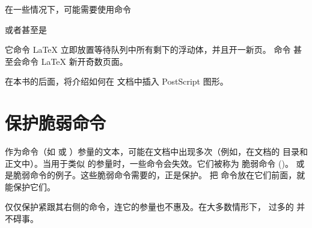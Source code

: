 在一些情况下，可能需要使用命令

\begin{lscommand}
 或者甚至是 
\end{lscommand}

\noindent
它命令 \LaTeX{} 立即放置等待队列中所有剩下的浮动体，并且开一新页。
命令  甚至会命令 \LaTeX{} 新开奇数页面。

在本书的后面，将介绍如何在 \LaTeXe{} 文档中插入 PostScript 图形。

\section{保护脆弱命令}

作为命令（如  或 ）参量的文本，可能在文档中出现多次（例如，在文档的
目录和正文中）。当用于类似  的参量时，一些命令会失效。它们被称为
脆弱命令 ()。 或  是脆弱命令的例子。这些脆弱命令需要的，正是保护。%
把  命令放在它们前面，就能保护它们。

 仅仅保护紧跟其右侧的命令，连它的参量也不惠及。在大多数情形下，
过多的  并不碍事。

